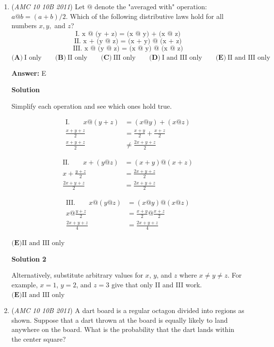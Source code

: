 \begin{enumerate}
 


	\item (\textit{AMC 10 10B 2011}) Let $@$ denote the "averaged with" operation: $a @ b = (a+b)/2$. Which of the following distributive laws hold for all numbers $x, y,$ and $z$? 
 \[\text{I. x @ (y + z) = (x @ y) + (x @ z)}\] 
 \[\text{II. x + (y @ z) = (x + y) @ (x + z)}\] 
 \[\text{III. x @ (y @ z) = (x @ y) @ (x @ z)}\]
$\textbf{(A)}\ \text{I only} \qquad\textbf{(B)}\ \text{II only} \qquad\textbf{(C)}\ \text{III only} \qquad\textbf{(D)}\ \text{I and III only} \qquad\textbf{(E)}\ \text{II and III only}$

 \textbf{Answer: }E



\textbf{Solution}

Simplify each operation and see which ones hold true.

 
 \begin{align*} \text{I.} \qquad x @ (y + z) &= (x @ y) + (x @ z)\\ \frac{x+y+z}{2} &= \frac{x+y}{2} + \frac{x+z}{2}\\ \frac{x+y+z}{2} &\not= \frac{2x+y+z}{2} \end{align*}


 \begin{align*} \text{II.} \qquad x + (y @ z) &= (x + y) @ (x + z)\\ x+ \frac{y+z}{2} &= \frac{2x+y+z}{2}\\ \frac{2x+y+z}{2} &= \frac{2x+y+z}{2} \end{align*}


 \begin{align*} \text{III.} \qquad x @ (y @ z) &= (x @ y) @ (x @ z)\\ x @ \frac{y+z}{2} &= \frac{x+y}{2} @ \frac{x+z}{2}\\ \frac{2x+y+z}{4} &= \frac{2x+y+z}{4} \end{align*}

$\boxed{\textbf{(E)} \text{II and III only}}$




\textbf{Solution 2}

Alternatively, substitute arbitrary values for $x$, $y$, and $z$ where $x\neq y\neq z$. For example, $x=1$, $y=2$, and $z=3$ give that only II and III work. $\boxed{\textbf{(E)} \text{II and III only}}$



	\item (\textit{AMC 10 10B 2011}) A dart board is a regular octagon divided into regions as shown. Suppose that a dart thrown at the board is equally likely to land anywhere on the board. What is the probability that the dart lands within the center square?



\end{enumerate}
